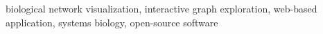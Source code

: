 biological network visualization, interactive graph exploration, web-based application, systems biology, open-source software